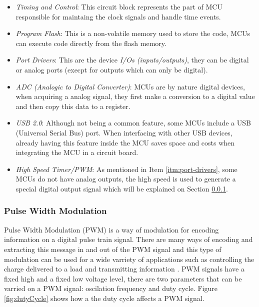 		\begin{itemize}
			\item\textit{Timing and Control}: This circuit block represents the part of MCU responsible for maintaing the clock signals and handle time events.\label{itm:timing-and-control}
			\item\textit{Program Flash}: This is a non-volatile memory used to store the code, MCUs can execute code directly from the flash memory.\label{itm:program-flash}
			\item\textit{Port Drivers}: This are the device \textit{I/Os (inputs/outputs)}, they can be digital or analog ports (execpt for outputs which can only be digital).\label{itm:port-drivers}
			\item\textit{ADC (Analogic to Digital Converter)}: MCUs are by nature digital devices, when acquiring a analog signal, they first make a conversion to a digital value and then copy this data to a register.\label{itm:adc}
			\item\textit{USB 2.0}: Although not being a common feature, some MCUs include a USB (Universal Serial Bus) port. When interfacing with other USB devices, already having this feature inside the MCU saves space and costs when integrating the MCU in a circuit board.\label{itm:mcu-usb}
			\item\textit{High Speed Timer/PWM}: As mentioned in Item \ref{itm:port-drivers}, some MCUs do not have analog outputs, the high speed is used to generate a special digital output signal which will be explained on Section \ref{ssec:mcu-pwm}.\label{itm:high-speed-timer-pwm}
		\end{itemize}

	\subsubsection{Pulse Width Modulation} \label{ssec:mcu-pwm}
			Pulse Width Modulation (PWM) is a way of modulation for encoding information on a digital pulse train signal. There are many ways of encoding and extracting this message in and out of the PWM signal and this type of modulation can be used for a wide varriety of applications such as controlling the charge delivered to a load and transmitting information \cite{standard19961037c}. PWM signals have a fixed high and a fixed low voltage level, there are two parameters that can be varried on a PWM signal: oscilation frequency and duty cycle. Figure \ref{fig:dutyCycle} shows how a the duty cycle affects a PWM signal. 

